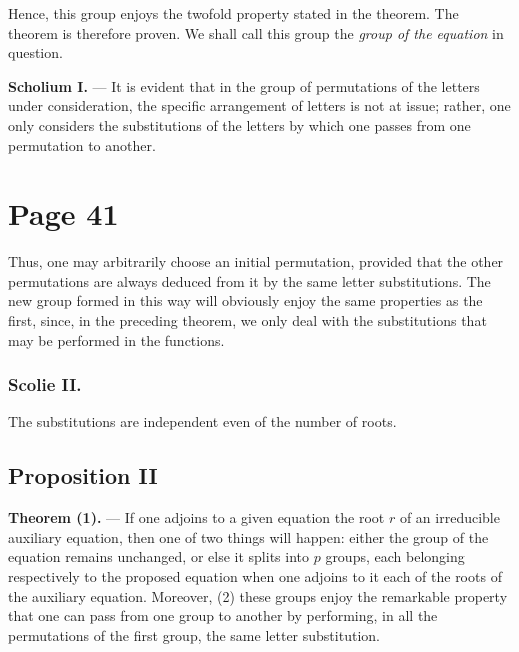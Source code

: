 \documentclass{article}
\begin{document}
\smallskip

\noindent
Hence, this group enjoys the twofold property stated in the theorem. The theorem is therefore proven. We shall call this group the \emph{group of the equation} in question.

\medskip

\noindent
\textbf{Scholium I.} --- It is evident that in the group of permutations of the letters under consideration, the specific arrangement of letters is not at issue; rather, one only considers the substitutions of the letters by which one passes from one permutation to another.



\section*{Page 41}

Thus, one may arbitrarily choose an initial permutation, provided that the other permutations are always deduced from it by the same letter substitutions. The new group formed in this way will obviously enjoy the same properties as the first, since, in the preceding theorem, we only deal with the substitutions that may be performed in the functions.

\subsubsection*{Scolie II.}
The substitutions are independent even of the number of roots.

\subsection*{Proposition II}

\textbf{Theorem (1).} --- If one adjoins to a given equation the root $r$ of an irreducible auxiliary equation, then one of two things will happen: either the group of the equation remains unchanged, or else it splits into $p$ groups, each belonging respectively to the proposed equation when one adjoins to it each of the roots of the auxiliary equation. Moreover, (2) these groups enjoy the remarkable property that one can pass from one group to another by performing, in all the permutations of the first group, the same letter substitution.
\end{document}
